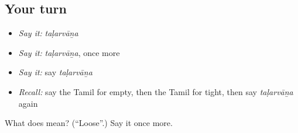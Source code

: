 \subsection*{Your turn}
\begin{itemize}
\raggedright
  \item \emph{Say it:} \emph{taḷarvāṉa}
  \item \emph{Say it:} \emph{taḷarvāṉa}, once more
  \item \emph{Say it:} say \emph{taḷarvāṉa}
  \item \emph{Recall:} say the Tamil for empty, then the Tamil for tight, then say \emph{taḷarvāṉa} again
\end{itemize}

\begin{tcolorbox}[breakable,colback=teal!4,colframe=teal!35!black,title={Before you move on}]
What does  mean? (\textquotedblleft{}Loose\textquotedblright{}.) Say it once more.
\end{tcolorbox}
